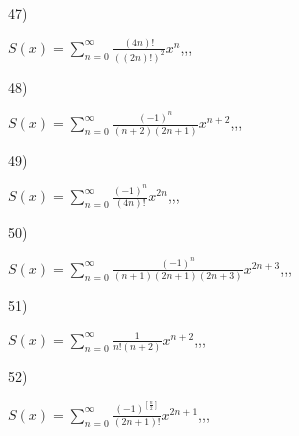 \documentclass[11pt, ukrainian]{article}
\begin{document}
\par
\vspace{0.9cm}
47) \space 
{%
{$S(x)=\sum\limits_{n=0}^{\infty}{\frac{(4n)!}{{((2n)!)^2}}}{x^{{n}}}$},,, \par \smallskip  
}
\par
\vspace{0.9cm}
48) \space 
{%
{$S(x)=\sum\limits_{n=0}^{\infty}{\frac{(-1)^n}{(n+2)(2n+1)}}{x^{{n+2}}}$},,, \par \smallskip  
}
\par
\newpage
49) \space 
{%
{$S(x)=\sum\limits_{n=0}^{\infty}{\frac{(-1)^n}{(4n)!}}{x^{{2n}}}$},,, \par \smallskip  
}
\par
\vspace{0.9cm}
50) \space 
{%
{$S(x)=\sum\limits_{n=0}^{\infty}{\frac{(-1)^n}{(n+1)(2n+1)(2n+3)}}{x^{{2n+3}}}$},,, \par \smallskip  
}
\par
\vspace{0.9cm}
51) \space 
{%
{$S(x)=\sum\limits_{n=0}^{\infty}{\frac{1}{n!(n+2)}}{x^{{n+2}}}$},,, \par \smallskip  
}
\par
\vspace{0.9cm}
52) \space 
{%
{$S(x)=\sum\limits_{n=0}^{\infty}{\frac{(-1)^{[\frac{n}{2}]}}{(2n+1)!}}{x^{{2n+1}}}$},,, \par \smallskip  
}
\end{document}
